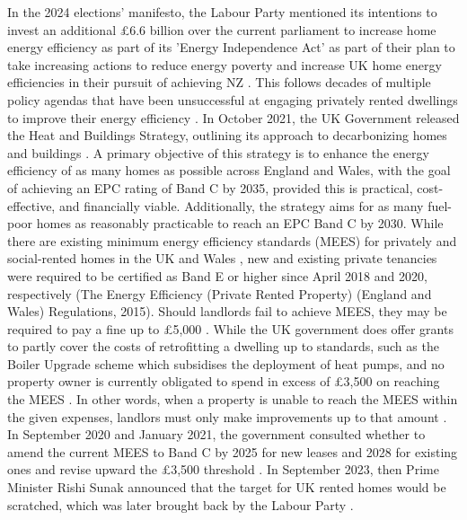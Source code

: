 In the 2024 elections’ manifesto, the Labour Party mentioned its intentions to invest an additional £6.6 billion over the current parliament to increase home energy efficiency as part of its 'Energy Independence Act' \cite{noauthor_make_nodate} as part of their plan to take increasing actions to reduce energy poverty and increase UK home energy efficiencies in their pursuit of achieving NZ \cite{scott_kings_2024}. This follows decades of multiple policy agendas that have been unsuccessful at engaging privately rented dwellings to improve their energy efficiency \cite{hope_attitudes_2014}. In October 2021, the UK Government released the Heat and Buildings Strategy, outlining its approach to decarbonizing homes and buildings \cite{department_for_energy_security_and_net_zero_desnz_and_department_for_business_energy_and_industrial_strategy_beis_heat_2021}. A primary objective of this strategy is to enhance the energy efficiency of as many homes as possible across England and Wales, with the goal of achieving an EPC rating of Band C by 2035, provided this is practical, cost-effective, and financially viable. Additionally, the strategy aims for as many fuel-poor homes as reasonably practicable to reach an EPC Band C by 2030. While there are existing minimum energy efficiency standards (MEES) for privately and social-rented homes in the UK and Wales \cite{rowe_housing_2024}, new and existing private tenancies were required to be certified as Band E or higher since April 2018 and 2020, respectively (The Energy Efficiency (Private Rented Property) (England and Wales) Regulations, 2015). Should landlords fail to achieve MEES, they may be required to pay a fine up to £5,000 \cite{department_for_energy_security_and_net_zero_2023_2023}. While the UK government does offer grants to partly cover the costs of retrofitting a dwelling up to standards, such as the Boiler Upgrade scheme which subsidises the deployment of heat pumps, and no property owner is currently obligated to spend in excess of £3,500 on reaching the MEES \cite{department_for_energy_security_and_net_zero_2023_2023}. In other words, when a property is unable to reach the MEES within the given expenses, landlors must only make improvements up to that amount \cite{department_for_energy_security_and_net_zero_2023_2023}.   In September 2020 and January 2021, the government consulted whether to amend the current MEES to Band C by 2025 for new leases and 2028 for existing ones and revise upward the £3,500 threshold \cite{department_for_energy_security_and_net_zero_desnz_and_department_for_business_energy_and_industrial_strategy_beis_heat_2021}. In September 2023, then Prime Minister Rishi Sunak announced that the target for UK rented homes would be scratched,  which was later brought back by the Labour Party \cite{noauthor_make_nodate}.\\


